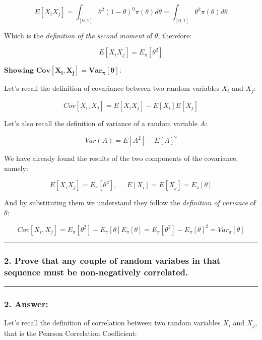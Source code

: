 \documentclass[
]{article}
\begin{document}
\[
E[X_iX_j] = \int_{[0,1]} \theta^{2}(1 - \theta)^{0} \pi(\theta)d\theta
= \int_{[0,1]} \theta^{2} \pi(\theta)d\theta
\]

Which is the \emph{definition of the second moment} of \(\theta\),
therefore:

\[
E[X_iX_j] = E_\pi[\theta^2]
\]

\(\textbf{Showing } \mathbf{Cov[X_i,X_j]=Var_{\pi}[\theta]}\):

Let's recall the definition of covariance between two random variables
\(X_i\) and \(X_j\):

\[
Cov[X_i,X_j] = E[X_iX_j]-E[X_i]E[X_j]
\]

Let's also recall the definition of variance of a random variable \(A\):

\[
Var(A) = E[A^2] - E[A]^2
\]

We have already found the results of the two components of the
covariance, namely:

\[
E[X_iX_j] = E_\pi[\theta^2], \;\;\;\;\;
E[X_i] = E[X_j] = E_\pi[\theta]
\]

And by substituting them we understand they follow the \emph{definition
of variance} of \(\theta\):

\[
Cov[X_i,X_j] = E_\pi[\theta^2] - E_\pi[\theta]E_\pi[\theta]
= E_\pi[\theta^2] - E_\pi[\theta]^2
= Var_\pi[\theta]
\]

\begin{center}\rule{0.5\linewidth}{0.5pt}\end{center}

\hypertarget{prove-that-any-couple-of-random-variabes-in-that-sequence-must-be-non-negatively-correlated.}{%
\subsubsection{2. Prove that any couple of random variabes in that
sequence must be non-negatively
correlated.}\label{prove-that-any-couple-of-random-variabes-in-that-sequence-must-be-non-negatively-correlated.}}

\begin{center}\rule{0.5\linewidth}{0.5pt}\end{center}

\hypertarget{answer-11}{%
\subsubsection{2. Answer:}\label{answer-11}}

Let's recall the definition of correlation between two random variables
\(X_i\) and \(X_j\), that is the Pearson Correlation Coefficient:
\end{document}
